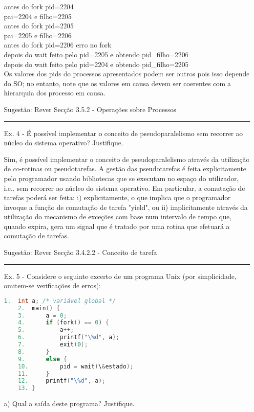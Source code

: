 \documentclass[11pt]{article}
\begin{document}
antes do fork pid=2204 \\
pai=2204 e filho=2205 \\
antes do fork pid=2205 \\
pai=2205 e filho=2206 \\
antes do fork pid=2206 erro no fork \\
depois do wait feito pelo pid=2205 e obtendo pid\_filho=2206 \\
depois do wait feito pelo pid=2204 e obtendo pid\_filho=2205 \\
Os valores dos pids do processos apresentados podem ser outros pois isso depende do SO; no entanto, note que os valores em causa devem ser coerentes com a hierarquia dos processo em causa.

Sugestão: Rever Secção 3.5.2 - Operações sobre Processos

\hrule

Ex. 4 - É possível implementar o conceito de pseudoparalelismo sem recorrer ao núcleo do sistema operativo? Justifique.

Sim, é possível implementar o conceito de pseudoparalelismo através da utilização de co-rotinas ou pseudotarefas. A gestão das pseudotarefas é feita explicitamente pelo programador usando bibliotecas que se executam no espaço do utilizador, i.e., sem recorrer ao núcleo do sistema operativo. Em particular, a comutação de tarefas poderá ser feita: i) explicitamente, o que implica que o programador invoque a função de comutação de tarefa "yield", ou ii) implicitamente através da utilização do mecanismo de exceções com base num intervalo de tempo que, quando expira, gera um signal que é tratado por uma rotina que efetuará a comutação de tarefas.

Sugestão: Rever Secção 3.4.2.2 - Conceito de tarefa


\hrule

Ex. 5 - Considere o seguinte excerto de um programa Unix (por simplicidade, omitem-se verificações de erros):

\begin{lstlisting}[language=C]
    1.  int a; /* variável global */
    2.  main() {
    3.      a = 0;
    4.      if (fork() == 0) {
    5.          a++;
    6.          printf("\%d", a);
    7.          exit(0);
    8.      }
    9.      else {
    10.         pid = wait(\&estado);
    11.     }
    12.     printf("\%d", a);
    13. }
\end{lstlisting}


a) Qual a saída deste programa? Justifique.
\end{document}
